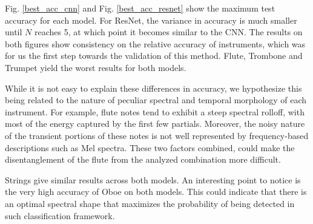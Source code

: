 \documentclass[runningheads,a4paper]{llncs}
\begin{document}
Fig. \ref{best_acc_cnn} and Fig. \ref{best_acc_resnet} show the maximum test accuracy for each model. For ResNet, the variance in accuracy is much smaller until $N$ reaches 5, at which point it becomes similar to the CNN. The results on both figures show consistency on the relative accuracy of instruments, which was for us the first step towards the validation of this method. Flute, Trombone and Trumpet yield the worst results for both models. 

While it is not easy to explain these differences in accuracy, we hypothesize this being related to the nature of peculiar spectral and temporal morphology of each instrument. For example, flute notes tend to exhibit a steep spectral rolloff, with most of the energy captured by the first few partials. Moreover, the noisy nature of the transient portions of these notes is not well represented by frequency-based descriptions such as Mel spectra. These two factors combined, could make the disentanglement of the flute from the analyzed combination more difficult.

Strings give similar results across both models. An interesting point to notice is the very high accuracy of Oboe on both models. This could indicate that there is an optimal spectral shape that maximizes the probability of being detected in such classification framework.
\end{document}
